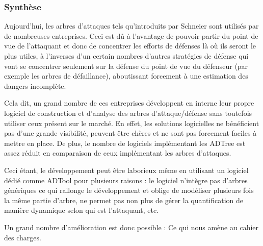         \subsubsection{Synthèse}
            Aujourd'hui, les arbres d'attaques tels qu'introduits par Schneier sont utilisés par de nombreuses entreprises. Ceci est dû à l'avantage de pouvoir partir du point de vue de l'attaquant et donc de concentrer les efforts de défenses là où ils seront le plus utiles, à l'inverses d'un certain nombres d'autres stratégies de défense qui vont se concentrer seulement sur la défense du point de vue du défenseur (par exemple les arbres de défaillance), aboutissant forcement à une estimation des dangers incomplète. 

            Cela dit, un grand nombre de ces entreprises développent en interne leur propre logiciel de construction et d'analyse des arbres d'attaque/défense sans toutefois utiliser ceux présent sur le marché. En effet, les solutions logicielles ne bénéficient pas d'une grande visibilité, peuvent être chères et ne sont pas forcement faciles à mettre en place. De plus, le nombre de logiciels implémentant les ADTree est assez réduit en comparaison de ceux implémentant les arbres d'attaques. 

            Ceci étant, le développement peut être laborieux même en utilisant un logiciel dédié comme ADTool pour plusieurs raisons : le logiciel n’intègre pas d'arbres génériques ce qui rallonge le développement et oblige de modéliser plusieurs fois la même partie d'arbre, ne permet pas non plus de gérer la quantification de manière dynamique selon qui est l'attaquant, etc.

            Un grand nombre d'amélioration est donc possible : Ce qui nous amène au cahier des charges.